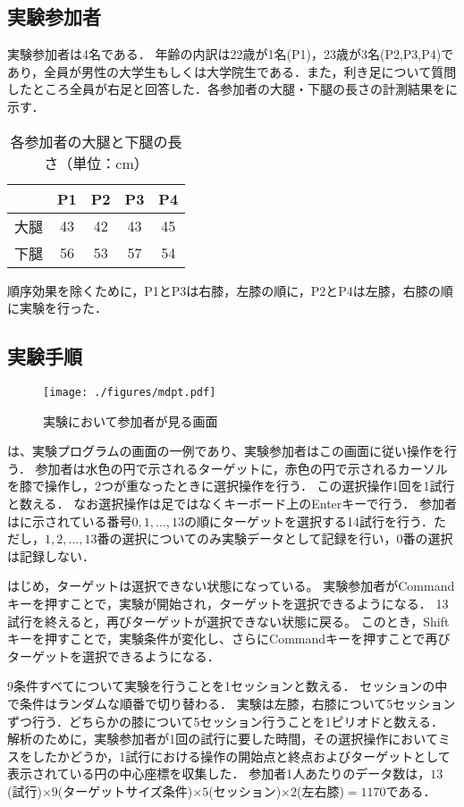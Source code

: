 \documentclass[submit, techrep]{ipsj}
\begin{document}
\subsection{実験参加者}
実験参加者は4名である．
年齢の内訳は22歳が1名(P1)，23歳が3名(P2,P3,P4)であり，全員が男性の大学生もしくは大学院生である．また，利き足について質問したところ全員が右足と回答した．各参加者の大腿・下腿の長さの計測結果をに示す．
\begin{table}[tb]
	\begin{center}
	\caption{各参加者の大腿と下腿の長さ（単位：cm）}
		\begin{tabular}{|c|c|c|c|c|}
		\hline
			& P1 & P2 & P3 & P4 \\ \hline
		大腿 & 43 & 42 & 43 & 45 \\ \hline
		下腿 & 56 & 53 & 57 & 54 \\ \hline
		\end{tabular}
		\label{tb:length}
	\end{center}
\end{table}

順序効果を除くために，P1とP3は右膝，左膝の順に，P2とP4は左膝，右膝の順に実験を行った．
\subsection{実験手順}
\begin{figure}[tb]
	\begin{center}
		\texttt{[image: ./figures/mdpt.pdf]}
	\end{center}
	\caption{実験において参加者が見る画面}
	\label{img:mdpt}
\end{figure}
は、実験プログラムの画面の一例であり、実験参加者はこの画面に従い操作を行う．
参加者は水色の円で示されるターゲットに，赤色の円で示されるカーソルを膝で操作し，2つが重なったときに選択操作を行う．
この選択操作1回を1試行と数える．
なお選択操作は足ではなくキーボード上のEnterキーで行う．
参加者はに示されている番号$0,1,...,13$の順にターゲットを選択する14試行を行う．ただし，$1,2,...,13$番の選択についてのみ実験データとして記録を行い，$0$番の選択は記録しない．\par
はじめ，ターゲットは選択できない状態になっている。
実験参加者がCommandキーを押すことで，実験が開始され，ターゲットを選択できるようになる．
13試行を終えると，再びターゲットが選択できない状態に戻る。
このとき，Shiftキーを押すことで，実験条件が変化し、さらにCommandキーを押すことで再びターゲットを選択できるようになる．\par
9条件すべてについて実験を行うことを1セッションと数える．
セッションの中で条件はランダムな順番で切り替わる．
実験は左膝，右膝について5セッションずつ行う．どちらかの膝について5セッション行うことを1ピリオドと数える．
解析のために，実験参加者が1回の試行に要した時間，その選択操作においてミスをしたかどうか，1試行における操作の開始点と終点およびターゲットとして表示されている円の中心座標を収集した．
参加者1人あたりのデータ数は，$13$(試行)$\times 9$(ターゲットサイズ条件)$\times 5$(セッション)$\times 2$(左右膝)$ = 1170$である．
\end{document}
